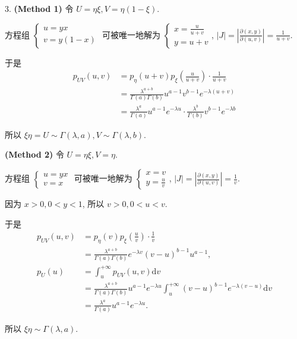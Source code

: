 \documentclass[UTF8]{ctexart}
\begin{document}
3. \textbf{(Method 1)} 令 $U=\eta\xi, V=\eta(1-\xi)$.

方程组 $\begin{cases} u=yx \\ v=y(1-x) \end{cases}$ 可被唯一地解为 $ \begin{cases} \displaystyle x=\frac{u}{u+v} \\ y=u+v \end{cases}$, $\displaystyle|J|=\left|\frac{\partial(x,y)}{\partial(u,v)}\right|=\frac{1}{u+v}$.

于是
\[
\begin{aligned}
p_{UV}(u,v)&=p_{\eta}(u+v)p_{\xi}\left(\frac{u}{u+v}\right)\cdot\frac{1}{u+v}\\
 &=\frac{\lambda^{a+b}}{\Gamma(a)\Gamma(b)}u^{a-1}v^{b-1}e^{-\lambda(u+v)}\\
 &=\frac{\lambda^{a}}{\Gamma(a)}u^{a-1}e^{-\lambda u}\cdot\frac{\lambda^{b}}{\Gamma(b)}v^{b-1}e^{-\lambda b}
\end{aligned}
\]

所以 $\xi\eta=U\sim\Gamma(\lambda,a), V\sim\Gamma(\lambda,b)$.

\textbf{(Method 2)} 令 $U=\eta\xi, V=\eta$.

方程组 $\begin{cases} u=yx \\ v=x \end{cases}$ 可被唯一地解为 $ \begin{cases} x=v \\ \displaystyle y=\frac{u}{v} \end{cases}$, $\displaystyle|J|=\left|\frac{\partial(x,y)}{\partial(u,v)}\right|=\frac{1}{v}$.

因为 $x>0,0<y<1$, 所以 $v>0, 0<u<v$.

于是
\[
\begin{aligned}
p_{UV}(u,v)&=p_{\eta}(v)p_{\xi}\left(\frac{u}{v}\right)\cdot\frac{1}{v}\\
 &=\frac{\lambda^{a+b}}{\Gamma(a)\Gamma(b)}e^{-\lambda v}(v-u)^{b-1}u^{a-1}, \\
p_{U}(u)&=\int_{u}^{+\infty}p_{UV}(u,v)\text{d}v\\
&=\frac{\lambda^{a+b}}{\Gamma(a)\Gamma(b)}u^{a-1}e^{-\lambda u}\int_{u}^{+\infty}(v-u)^{b-1}e^{-\lambda(v-u)}\text{d}v\\
&=\frac{\lambda^a}{\Gamma(a)}u^{a-1}e^{-\lambda u}.
\end{aligned}
\]

所以 $\xi\eta\sim \Gamma(\lambda,a)$.
\end{document}
